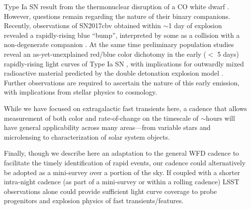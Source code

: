 \documentclass[12pt, letterpaper]{article}
\begin{document}
\smallskip
{}
Type Ia SN result from the thermonuclear disruption of a CO white dwarf \citep{Hillebrandt2000}. However, questions remain regarding the nature of their binary companions. Recently, observations of SN2017cbv obtained within $\sim$1 day of explosion revealed a rapidly-rising blue ``bump'', interpreted by some as a collision with a non-degenerate companion \citep{Hosseinzadeh2017}. At the same time preliminary population studies reveal an as-yet-unexplained red/blue color dichotomy in the early ($<$ 5 days) rapidly-rising light curves of Type Ia SN \citep{Stritzinger2018}, with implications for outwardly mixed radioactive material predicted by the double detonation explosion model \citep{Piro2016,Polin2018}. Further observations are required to ascertain the nature of this early emission, with implications from stellar physics to cosmology.




\smallskip
{} While we have focused on extragalactic fast transients here, a cadence that allows measurement of both color and rate-of-change on the timescale of $\sim$hours will have general applicability across many areas---from variable stars and microlensing to characterization of solar system objects.

\smallskip
Finally, though we describe here an adaptation to the general WFD cadence to facilitate the timely identification of rapid events, our cadence could alternatively be adopted as a mini-survey over a portion of the sky. If coupled with a shorter intra-night cadence (as part of a mini-survey or within a rolling cadence) LSST observations alone could provide sufficient light curve coverage to probe progenitors and explosion physics of fast transients/features.

\bigskip


\clearpage


\end{document}
